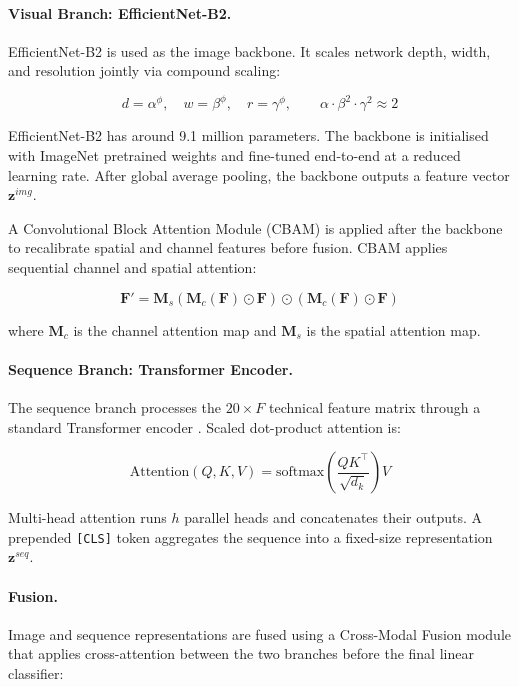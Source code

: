 \paragraph{Visual Branch: EfficientNet-B2.}
EfficientNet-B2 \parencite{tan2019} is used as the image backbone. It scales network depth, width, and resolution jointly via compound scaling:

\begin{equation}
d = \alpha^\phi, \quad w = \beta^\phi, \quad r = \gamma^\phi, \qquad \alpha \cdot \beta^2 \cdot \gamma^2 \approx 2
\label{eq:eff_scaling}
\end{equation}

EfficientNet-B2 has around 9.1 million parameters. The backbone is initialised with ImageNet pretrained weights and fine-tuned end-to-end at a reduced learning rate. After global average pooling, the backbone outputs a feature vector $\mathbf{z}^{img}$.

A Convolutional Block Attention Module (CBAM) \parencite{Woo2018cbam} is applied after the backbone to recalibrate spatial and channel features before fusion. CBAM applies sequential channel and spatial attention:

\begin{equation}
\mathbf{F}' = \mathbf{M}_s(\mathbf{M}_c(\mathbf{F}) \odot \mathbf{F}) \odot (\mathbf{M}_c(\mathbf{F}) \odot \mathbf{F})
\label{eq:cbam}
\end{equation}

where $\mathbf{M}_c$ is the channel attention map and $\mathbf{M}_s$ is the spatial attention map.

\paragraph{Sequence Branch: Transformer Encoder.}
The sequence branch processes the $20 \times F$ technical feature matrix through a standard Transformer encoder \parencite{vaswani2017}. Scaled dot-product attention is:

\begin{equation}
\text{Attention}(Q, K, V) = \text{softmax}\!\left(\frac{QK^\top}{\sqrt{d_k}}\right) V
\label{eq:attention}
\end{equation}

Multi-head attention runs $h$ parallel heads and concatenates their outputs. A prepended \texttt{[CLS]} token aggregates the sequence into a fixed-size representation $\mathbf{z}^{seq}$.

\paragraph{Fusion.}
Image and sequence representations are fused using a Cross-Modal Fusion module that applies cross-attention between the two branches before the final linear classifier:

